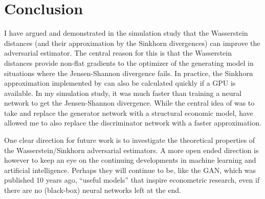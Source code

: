 \section{Conclusion}
\label{sec:conclusion}

I have argued and demonstrated in the simulation study that the Wasserstein distances (and their approximation by the Sinkhorn divergences) can improve the adversarial estimator.
The central reason for this is that the Wasserstein distances provide non-flat gradients to the optimizer of the generating model in situations where the Jensen-Shannon divergence fails.
In practice, the Sinkhorn approximation implemented by \textcite{feydy2019interpolating} can also be calculated quickly if a GPU is available.
In my simulation study, it was much faster than training a neural network to get the Jensen-Shannon divergence.
While the central idea of \textcite{kaji2023adversarial} was to take \textcite{goodfellow2014generative} and replace the generator network with a structural economic model,
\textcite{feydy2019interpolating} have allowed me to also replace the discriminator network with a faster approximation.

One clear direction for future work is to investigate the theoretical properties of the Wasserstein/Sinkhorn adversarial estimators.
A more open ended direction is however to keep an eye on the continuing developments in machine learning and artificial intelligence.
Perhaps they will continue to be, like the GAN, which was published 10 years ago, ``useful models'' that inspire econometric research,
even if there are no (black-box) neural networks left at the end.
